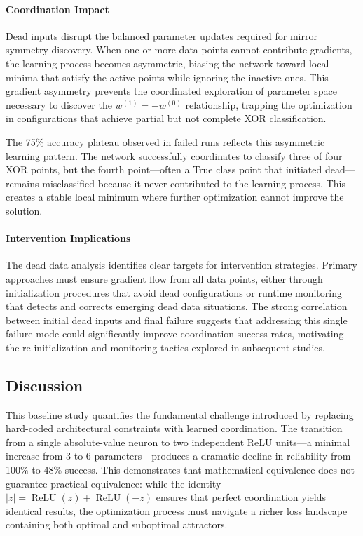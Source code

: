 \paragraph{Coordination Impact}
Dead inputs disrupt the balanced parameter updates required for mirror symmetry discovery. When one or more data points cannot contribute gradients, the learning process becomes asymmetric, biasing the network toward local minima that satisfy the active points while ignoring the inactive ones. This gradient asymmetry prevents the coordinated exploration of parameter space necessary to discover the $w^{(1)} = -w^{(0)}$ relationship, trapping the optimization in configurations that achieve partial but not complete XOR classification.

The 75\% accuracy plateau observed in failed runs reflects this asymmetric learning pattern. The network successfully coordinates to classify three of four XOR points, but the fourth point—often a True class point that initiated dead—remains misclassified because it never contributed to the learning process. This creates a stable local minimum where further optimization cannot improve the solution.

\paragraph{Intervention Implications}
The dead data analysis identifies clear targets for intervention strategies. Primary approaches must ensure gradient flow from all data points, either through initialization procedures that avoid dead configurations or runtime monitoring that detects and corrects emerging dead data situations. The strong correlation between initial dead inputs and final failure suggests that addressing this single failure mode could significantly improve coordination success rates, motivating the re-initialization and monitoring tactics explored in subsequent studies.


\subsection*{Discussion}

This baseline study quantifies the fundamental challenge introduced by replacing hard-coded architectural constraints with learned coordination. The transition from a single absolute-value neuron to two independent ReLU units—a minimal increase from 3 to 6 parameters—produces a dramatic decline in reliability from 100\% to 48\% success. This demonstrates that mathematical equivalence does not guarantee practical equivalence: while the identity $|z| = \operatorname{ReLU}(z) + \operatorname{ReLU}(-z)$ ensures that perfect coordination yields identical results, the optimization process must navigate a richer loss landscape containing both optimal and suboptimal attractors.

